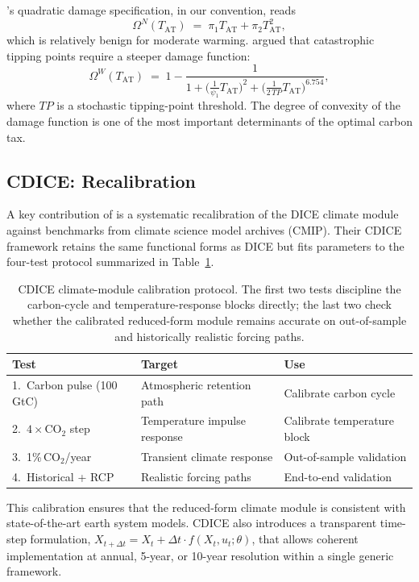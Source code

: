 \documentclass[11pt,a4paper]{report}
\begin{document}
\citet{nordhaus2008question}'s quadratic damage specification, in our convention, reads
\begin{equation}
\Omega^N(T_{\mathrm{AT}}) \;=\; \pi_1 T_{\mathrm{AT}} + \pi_2 T_{\mathrm{AT}}^2,
\label{eq:damage_nordhaus}
\end{equation}
which is relatively benign for moderate warming.  \citet{weitzman2012ghg} argued that catastrophic tipping points require a steeper damage function:
\begin{equation}
\Omega^W(T_{\mathrm{AT}}) \;=\; 1 - \frac{1}{1 + \bigl(\tfrac{1}{\psi_1} T_{\mathrm{AT}}\bigr)^2 + \bigl(\tfrac{1}{2\, TP} T_{\mathrm{AT}}\bigr)^{6.754}},
\label{eq:damage_weitzman}
\end{equation}
where $TP$ is a stochastic tipping-point threshold.  The degree of convexity of the damage function is one of the most important determinants of the optimal carbon tax.

\subsection{CDICE: Recalibration}

A key contribution of \citet{Folini_2021} is a systematic recalibration of the DICE climate module against benchmarks from climate science model archives (CMIP).  Their CDICE framework retains the same functional forms as DICE but fits parameters to the four-test protocol summarized in Table~\ref{tab:cdice_tests}.
\begin{table}[ht]
\centering
\small
\caption{CDICE climate-module calibration protocol.  The first two tests discipline the carbon-cycle and temperature-response blocks directly; the last two check whether the calibrated reduced-form module remains accurate on out-of-sample and historically realistic forcing paths.}
\label{tab:cdice_tests}
\begin{tabular}{lll}
\toprule
\textbf{Test} & \textbf{Target} & \textbf{Use} \\
\midrule
1.\ Carbon pulse (100\,GtC) & Atmospheric retention path & Calibrate carbon cycle \\
2.\ $4\times$CO$_2$ step & Temperature impulse response & Calibrate temperature block \\
3.\ 1\%\,CO$_2$/year & Transient climate response & Out-of-sample validation \\
4.\ Historical + RCP & Realistic forcing paths & End-to-end validation \\
\bottomrule
\end{tabular}
\end{table}
This calibration ensures that the reduced-form climate module is consistent with state-of-the-art earth system models.  CDICE also introduces a transparent time-step formulation, $X_{t+\Delta t} = X_t + \Delta t \cdot f(X_t, u_t; \theta)$, that allows coherent implementation at annual, 5-year, or 10-year resolution within a single generic framework.
\end{document}
